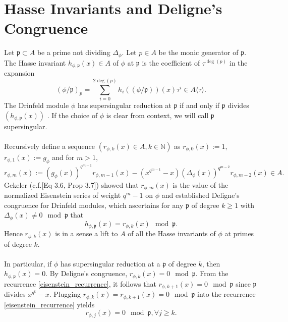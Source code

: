 \documentclass{article}
\theoremstyle{plain}
\theoremstyle{definition}
\newcommand{\D}{\Delta}
\newcommand{\ph}{(\phi/\p)}
\newcommand{\p}{\mathfrak p}
\begin{document}
\section{Hasse Invariants and Deligne's Congruence}
Let $\p \subset A$ be a prime not dividing $\Delta_\phi$. Let $p \in A$ be the monic generator of $\p$. The Hasse invariant $h_{\phi,\p}(x) \in A$ of $\phi$ at $\p$ is the coefficient of $\tau^{\deg(p)}$ in the expansion $$\ph_p  = \sum_{i=0}^{2\deg(p)} h_i(\ph)(x) \tau^i \in A\langle \tau \rangle.$$
The Drinfeld module $\phi$ has supersingular reduction at $\p$ if and only if $\p$ divides $(h_{\phi,\p}(x))$ \cite{gos}. If the choice of $\phi$ is clear from context, we will call $\p$ supersingular.\\ \\
Recursively define a sequence $(r_{\phi,k}(x) \in A,k \in \mathbb{N})$ as $r_{\phi,0}(x):=1$, $r_{\phi,1}(x):=g_\phi$ and for $m>1$,
\begin{equation}\label{eisenstein_recurrence}
r_{\phi,m}(x) := \left(g_\phi(x)\right)^{q^{m-1}}r_{\phi,m-1}(x) - (x^{q^{m-1}}-x) \left(\D_\phi(x)\right)^{q^{m-2}} r_{\phi,m-2}(x) \in A.
\end{equation}
Gekeler (c.f.\cite{gek}[Eq 3.6, Prop 3.7]) showed that $r_{\phi,m}(x)$ is the value of the normalized Eisenstein series of weight $q^{m}-1$ on $\phi$ and established Deligne's congruence for Drinfeld modules, which ascertains for any $\p$ of degree $k \geq 1$ with $\Delta_\phi(x) \neq 0 \mod \p$ that 
\begin{equation}\label{deligne_congruence}
 h_{\phi,\p}(x) = r_{\phi,k}(x) \mod \p.
\end{equation}
Hence $r_{\phi,k}(x)$ is in a sense a lift to $A$ of all the Hasse invariants of $\phi$ at primes of degree $k$.\\ \\
In particular, if $\phi$ has supersingular reduction at a $\p$ of degree $k$, then $h_{\phi,\p}(x)=0$. By Deligne's congruence, $r_{\phi,k}(x) = 0 \mod \p$. From the recurrence \ref{eisenstein_recurrence}, it follows that $r_{\phi,k+1}(x) = 0 \mod \p$ since $\p$ divides $x^{q^k}-x$. Plugging $r_{\phi,k}(x) = r_{\phi,k+1}(x)= 0 \mod \p$ into the recurrence \ref{eisenstein_recurrence} yields  
\begin{equation}\label{supersingular_zero}
 r_{\phi,j}(x) = 0 \mod \p , \forall j \geq k.
\end{equation}
\end{document}
